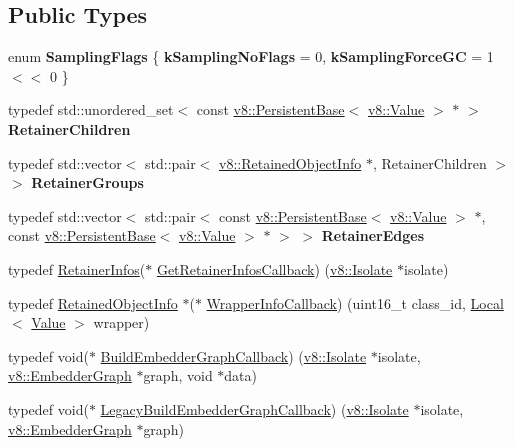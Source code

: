 \subsection*{Public Types}
\begin{DoxyCompactItemize}
\item 
\mbox{\label{classv8_1_1HeapProfiler_aa7826fbe67065080b08309e8f649e049}} 
enum {\bfseries Sampling\+Flags} \{ {\bfseries k\+Sampling\+No\+Flags} = 0, 
{\bfseries k\+Sampling\+Force\+GC} = 1 $<$$<$ 0
 \}
\item 
\mbox{\label{classv8_1_1HeapProfiler_a459770a1e023a4a98a817ec2f0d0195c}} 
typedef std\+::unordered\+\_\+set$<$ const \mbox{\hyperlink{classv8_1_1PersistentBase}{v8\+::\+Persistent\+Base}}$<$ \mbox{\hyperlink{classv8_1_1Value}{v8\+::\+Value}} $>$ $\ast$ $>$ {\bfseries Retainer\+Children}
\item 
\mbox{\label{classv8_1_1HeapProfiler_ab61d84f0fbd7ec48a7a4d29928621c62}} 
typedef std\+::vector$<$ std\+::pair$<$ \mbox{\hyperlink{classv8_1_1RetainedObjectInfo}{v8\+::\+Retained\+Object\+Info}} $\ast$, Retainer\+Children $>$ $>$ {\bfseries Retainer\+Groups}
\item 
\mbox{\label{classv8_1_1HeapProfiler_ab3b813a74e2b76b4d617c7eea269fa0f}} 
typedef std\+::vector$<$ std\+::pair$<$ const \mbox{\hyperlink{classv8_1_1PersistentBase}{v8\+::\+Persistent\+Base}}$<$ \mbox{\hyperlink{classv8_1_1Value}{v8\+::\+Value}} $>$ $\ast$, const \mbox{\hyperlink{classv8_1_1PersistentBase}{v8\+::\+Persistent\+Base}}$<$ \mbox{\hyperlink{classv8_1_1Value}{v8\+::\+Value}} $>$ $\ast$ $>$ $>$ {\bfseries Retainer\+Edges}
\item 
typedef \mbox{\hyperlink{structv8_1_1HeapProfiler_1_1RetainerInfos}{Retainer\+Infos}}($\ast$ \mbox{\hyperlink{classv8_1_1HeapProfiler_a7f34c8eb67f9502e5778695187ea0e96}{Get\+Retainer\+Infos\+Callback}}) (\mbox{\hyperlink{classv8_1_1Isolate}{v8\+::\+Isolate}} $\ast$isolate)
\item 
typedef \mbox{\hyperlink{classv8_1_1RetainedObjectInfo}{Retained\+Object\+Info}} $\ast$($\ast$ \mbox{\hyperlink{classv8_1_1HeapProfiler_a677025dd201fd832e0464e5ab0b0d0d4}{Wrapper\+Info\+Callback}}) (uint16\+\_\+t class\+\_\+id, \mbox{\hyperlink{classv8_1_1Local}{Local}}$<$ \mbox{\hyperlink{classv8_1_1Value}{Value}} $>$ wrapper)
\item 
typedef void($\ast$ \mbox{\hyperlink{classv8_1_1HeapProfiler_a29c98afa5ce0ea543eef904201bc3e40}{Build\+Embedder\+Graph\+Callback}}) (\mbox{\hyperlink{classv8_1_1Isolate}{v8\+::\+Isolate}} $\ast$isolate, \mbox{\hyperlink{classv8_1_1EmbedderGraph}{v8\+::\+Embedder\+Graph}} $\ast$graph, void $\ast$data)
\item 
typedef void($\ast$ \mbox{\hyperlink{classv8_1_1HeapProfiler_aafaa85413706329f7767f559b701eb1a}{Legacy\+Build\+Embedder\+Graph\+Callback}}) (\mbox{\hyperlink{classv8_1_1Isolate}{v8\+::\+Isolate}} $\ast$isolate, \mbox{\hyperlink{classv8_1_1EmbedderGraph}{v8\+::\+Embedder\+Graph}} $\ast$graph)
\end{DoxyCompactItemize}
